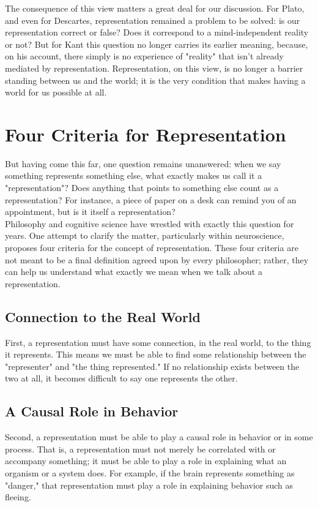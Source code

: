 The consequence of this view matters a great deal for our discussion. For Plato, and even for Descartes, representation remained a problem to be solved: is our representation correct or false? Does it correspond to a mind-independent reality or not? But for Kant this question no longer carries its earlier meaning, because, on his account, there simply is no experience of "reality" that isn't already mediated by representation. Representation, on this view, is no longer a barrier standing between us and the world; it is the very condition that makes having a world for us possible at all.

\section{Four Criteria for Representation}
\label{sec:four-criteria-representation}

But having come this far, one question remains unanswered: when we say something represents something else, what exactly makes us call it a "representation"? Does anything that points to something else count as a representation? For instance, a piece of paper on a desk can remind you of an appointment, but is it itself a representation?\\
Philosophy and cognitive science have wrestled with exactly this question for years. One attempt to clarify the matter, particularly within neuroscience, proposes four criteria for the concept of representation\autocite{baker2021representation}. These four criteria are not meant to be a final definition agreed upon by every philosopher; rather, they can help us understand what exactly we mean when we talk about a representation.\newpage

\subsection{Connection to the Real World}
\label{sub:criterion-real-world-connection}
First, a representation must have some connection, in the real world, to the thing it represents. This means we must be able to find some relationship between the "representer" and "the thing represented." If no relationship exists between the two at all, it becomes difficult to say one represents the other.
\subsection{A Causal Role in Behavior}
\label{sub:criterion-causal-role}
Second, a representation must be able to play a causal role in behavior or in some process. That is, a representation must not merely be correlated with or accompany something; it must be able to play a role in explaining what an organism or a system does. For example, if the brain represents something as "danger," that representation must play a role in explaining behavior such as fleeing.
